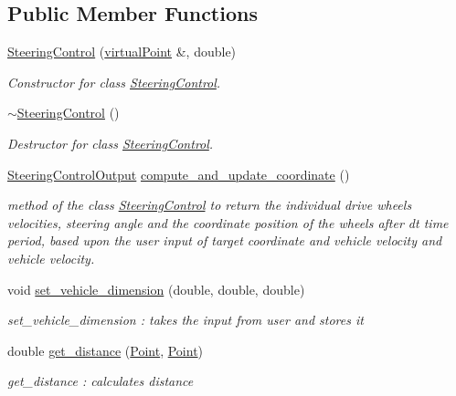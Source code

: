 \subsection*{Public Member Functions}
\begin{DoxyCompactItemize}
\item 
\hyperlink{classSteeringControl_abb1f91984cfc24893b61142fb5af297f}{Steering\+Control} (\hyperlink{classvirtualPoint}{virtual\+Point} \&, double)
\begin{DoxyCompactList}\small\item\em Constructor for class \hyperlink{classSteeringControl}{Steering\+Control}. \end{DoxyCompactList}\item 
\hyperlink{classSteeringControl_a9ebb8eef465b7a1adf81271e08e34835}{$\sim$\+Steering\+Control} ()
\begin{DoxyCompactList}\small\item\em Destructor for class \hyperlink{classSteeringControl}{Steering\+Control}. \end{DoxyCompactList}\item 
\hyperlink{classSteeringControlOutput}{Steering\+Control\+Output} \hyperlink{classSteeringControl_ad4ee84da254d91ecc1811da027b4482c}{compute\+\_\+and\+\_\+update\+\_\+coordinate} ()
\begin{DoxyCompactList}\small\item\em method of the class \hyperlink{classSteeringControl}{Steering\+Control} to return the individual drive wheels velocities, steering angle and the coordinate position of the wheels after dt time period, based upon the user input of target coordinate and vehicle velocity and vehicle velocity. \end{DoxyCompactList}\item 
void \hyperlink{classSteeringControl_a6698bb99d4feccac1d9dc8c961bfaf72}{set\+\_\+vehicle\+\_\+dimension} (double, double, double)
\begin{DoxyCompactList}\small\item\em set\+\_\+vehicle\+\_\+dimension \+: takes the input from user and stores it \end{DoxyCompactList}\item 
double \hyperlink{classSteeringControl_abf86c529e73e50fa87cf25be79f3d7f4}{get\+\_\+distance} (\hyperlink{classPoint}{Point}, \hyperlink{classPoint}{Point})
\begin{DoxyCompactList}\small\item\em get\+\_\+distance \+: calculates distance \end{DoxyCompactList}\item 

\end{DoxyCompactItemize}
